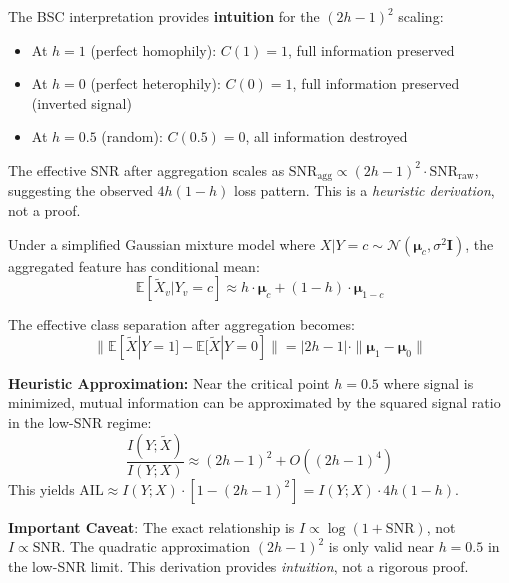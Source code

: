 \begin{remark}
\label{rem:bsc_ail_connection}
The BSC interpretation provides \textbf{intuition} for the $(2h-1)^2$ scaling:
\begin{itemize}
    \item At $h = 1$ (perfect homophily): $C(1) = 1$, full information preserved
    \item At $h = 0$ (perfect heterophily): $C(0) = 1$, full information preserved (inverted signal)
    \item At $h = 0.5$ (random): $C(0.5) = 0$, all information destroyed
\end{itemize}
The effective SNR after aggregation scales as $\text{SNR}_{\text{agg}} \propto (2h-1)^2 \cdot \text{SNR}_{\text{raw}}$, suggesting the observed $4h(1-h)$ loss pattern. This is a \textit{heuristic derivation}, not a proof.
\end{remark}

\begin{justification}
Under a simplified Gaussian mixture model where $X | Y=c \sim \mathcal{N}(\boldsymbol{\mu}_c, \sigma^2 \mathbf{I})$, the aggregated feature has conditional mean:
\begin{equation}
    \mathbb{E}[\tilde{X}_v | Y_v = c] \approx h \cdot \boldsymbol{\mu}_c + (1-h) \cdot \boldsymbol{\mu}_{1-c}
\end{equation}

The effective class separation after aggregation becomes:
\begin{equation}
    \|\mathbb{E}[\tilde{X} | Y=1] - \mathbb{E}[\tilde{X} | Y=0]\| = |2h-1| \cdot \|\boldsymbol{\mu}_1 - \boldsymbol{\mu}_0\|
\end{equation}

\textbf{Heuristic Approximation:} Near the critical point $h = 0.5$ where signal is minimized, mutual information can be approximated by the squared signal ratio in the low-SNR regime:
\begin{equation}
    \frac{I(Y; \tilde{X})}{I(Y; X)} \approx (2h-1)^2 + O((2h-1)^4)
\end{equation}
This yields $\text{AIL} \approx I(Y;X) \cdot [1 - (2h-1)^2] = I(Y;X) \cdot 4h(1-h)$.

\textbf{Important Caveat}: The exact relationship is $I \propto \log(1 + \text{SNR})$, not $I \propto \text{SNR}$. The quadratic approximation $(2h-1)^2$ is only valid near $h = 0.5$ in the low-SNR limit. This derivation provides \textit{intuition}, not a rigorous proof.
\end{justification}

